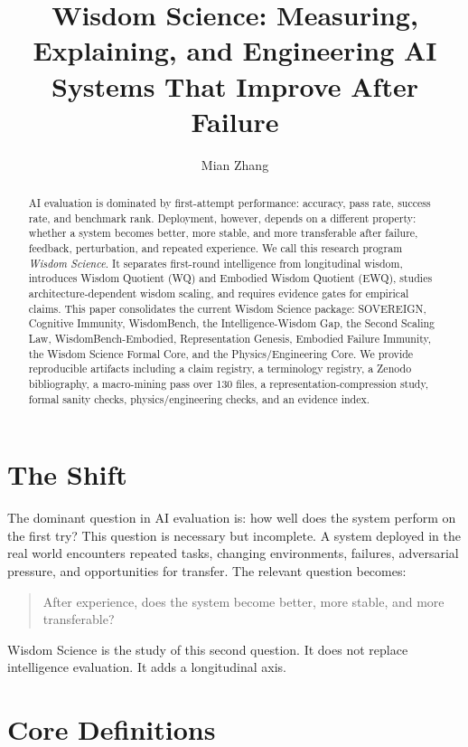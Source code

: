 \documentclass[11pt]{article}
\title{Wisdom Science: Measuring, Explaining, and Engineering AI Systems That Improve After Failure}
\author{Mian Zhang}
\date{}
\begin{document}
\maketitle

\begin{abstract}
AI evaluation is dominated by first-attempt performance: accuracy, pass rate, success rate, and benchmark rank.
Deployment, however, depends on a different property: whether a system becomes better, more stable, and more transferable after failure, feedback, perturbation, and repeated experience.
We call this research program \emph{Wisdom Science}.
It separates first-round intelligence from longitudinal wisdom, introduces Wisdom Quotient (WQ) and Embodied Wisdom Quotient (EWQ), studies architecture-dependent wisdom scaling, and requires evidence gates for empirical claims.
This paper consolidates the current Wisdom Science package: SOVEREIGN, Cognitive Immunity, WisdomBench, the Intelligence-Wisdom Gap, the Second Scaling Law, WisdomBench-Embodied, Representation Genesis, Embodied Failure Immunity, the Wisdom Science Formal Core, and the Physics/Engineering Core.
We provide reproducible artifacts including a claim registry, a terminology registry, a Zenodo bibliography, a macro-mining pass over 130 files, a representation-compression study, formal sanity checks, physics/engineering checks, and an evidence index.
\end{abstract}

\section{The Shift}

The dominant question in AI evaluation is: how well does the system perform on the first try?
This question is necessary but incomplete.
A system deployed in the real world encounters repeated tasks, changing environments, failures, adversarial pressure, and opportunities for transfer.
The relevant question becomes:

\begin{quote}
After experience, does the system become better, more stable, and more transferable?
\end{quote}

Wisdom Science is the study of this second question.
It does not replace intelligence evaluation.
It adds a longitudinal axis.

\section{Core Definitions}
\end{document}
